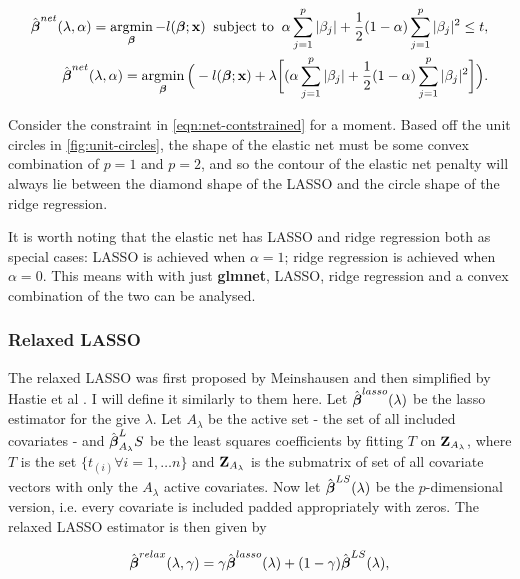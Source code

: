 \begin{align}
    \hat{\boldsymbol{\beta}}^{net}(\lambda,\alpha) = \operatorname*{argmin}_{\boldsymbol{\beta}} -l(\boldsymbol{\beta};\textbf{x})\;\;\textrm{subject to}\;\;\alpha\sum_{j=1}^p|\beta_j|+\frac{1}{2}(1-\alpha)\sum_{j=1}^p|\beta_j|^2\leq t,\label{eqn:net-contstrained}\\
    \hat{\boldsymbol{\beta}}^{net}(\lambda,\alpha)=\operatorname*{argmin}_{\boldsymbol{\beta}}\Big(-l(\boldsymbol{\beta};\textbf{x})+\lambda\bigg[(\alpha\sum_{j=1}^p|\beta_j|+\frac{1}{2}(1-\alpha)\sum_{j=1}^p|\beta_j|^2\bigg]\Big)\label{eqn:net-penalised}.
\end{align}

Consider the constraint in \cref{eqn:net-contstrained} for a moment. Based off the unit circles in \cref{fig:unit-circles}, the shape of the elastic net must be some convex combination of $p=1$ and $p=2$, and so the contour of the elastic net penalty will always lie between the diamond shape of the LASSO and the circle shape of the ridge regression.

It is worth noting that the elastic net has LASSO and ridge regression both as special cases: LASSO is achieved when $\alpha=1$; ridge regression is achieved when $\alpha=0$. This means with with just \textbf{glmnet}, LASSO, ridge regression and a convex combination of the two can be analysed.

\subsubsection{Relaxed LASSO}\label{sec:relaxed-lasso}

The relaxed LASSO was first proposed by Meinshausen  and then simplified by Hastie et al . I will define it similarly to them here. Let $\hat{\boldsymbol{\beta}}^{lasso}(\lambda)$ be the lasso estimator for the give $\lambda$. Let $A_\lambda$ be the active set - the set of all included covariates - and $\hat{\boldsymbol{\beta}}_{A_\lambda}^LS$ be the least squares coefficients by fitting $T$ on $\textbf{Z}_{A_\lambda}$, where $T$ is the set $\{t_{(i)}\forall i=1,\ldots n\}$ and $\textbf{Z}_{A_\lambda}$ is the submatrix of set of all covariate vectors with only the $A_\lambda$ active covariates. Now let $\hat{\boldsymbol{\beta}}^{LS}(\lambda)$ be the $p$-dimensional version, i.e. every covariate is included padded appropriately with zeros. The relaxed LASSO estimator is then given by

\begin{equation}
    \hat{\boldsymbol{\beta}}^{relax}(\lambda,\gamma)=\gamma\hat{\boldsymbol{\beta}}^{lasso}(\lambda)+(1-\gamma)\hat{\boldsymbol{\beta}}^{LS}(\lambda),
\end{equation}

